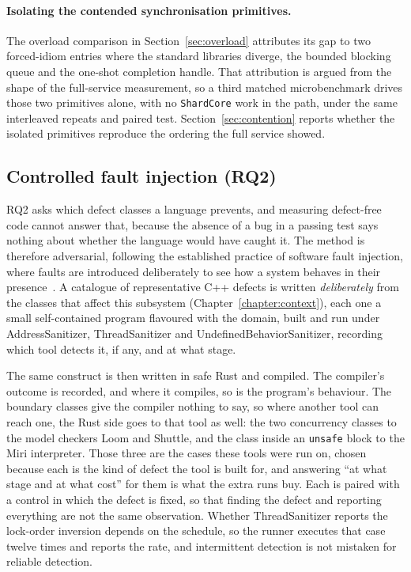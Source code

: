 \paragraph{Isolating the contended synchronisation primitives.}
The overload comparison in Section~\ref{sec:overload} attributes its gap to two forced-idiom
entries where the standard libraries diverge, the bounded blocking queue and the one-shot
completion handle. That attribution is argued from the shape of the full-service measurement, so
a third matched microbenchmark drives those two primitives alone, with no \texttt{ShardCore}
work in the path, under the same interleaved repeats and paired test.
Section~\ref{sec:contention} reports whether the isolated primitives reproduce the ordering the
full service showed.

\subsection{Controlled fault injection (RQ2)}\label{sec:methodfaults}
RQ2 asks which defect classes a language prevents, and measuring defect-free code cannot answer
that, because the absence of a bug in a passing test says nothing about whether the language
would have caught it. The method is therefore adversarial, following the established practice of
software fault injection, where faults are introduced deliberately to see how a system behaves
in their presence~\cite{natella2016fault}. A catalogue of representative C++ defects is written
\emph{deliberately} from the classes that affect this subsystem (Chapter~\ref{chapter:context}),
each one a small self-contained program flavoured with the domain, built and run under
AddressSanitizer, ThreadSanitizer and UndefinedBehaviorSanitizer, recording which tool detects
it, if any, and at what stage.

The same construct is then written in safe Rust and compiled. The compiler's outcome is
recorded, and where it compiles, so is the program's behaviour. The boundary classes give the
compiler nothing to say, so where another tool can reach one, the Rust side goes to that tool as
well: the two concurrency classes to the model checkers Loom and Shuttle, and the class inside
an \texttt{unsafe} block to the Miri interpreter. Those three are the cases these tools were run
on, chosen because each is the kind of defect the tool is built for, and answering ``at what
stage and at what cost'' for them is what the extra runs buy. Each is paired with a control in
which the defect is fixed, so that finding the defect and reporting everything are not the same
observation. Whether ThreadSanitizer reports the lock-order inversion depends on the schedule,
so the runner executes that case twelve times and reports the rate, and intermittent detection
is not mistaken for reliable detection.

